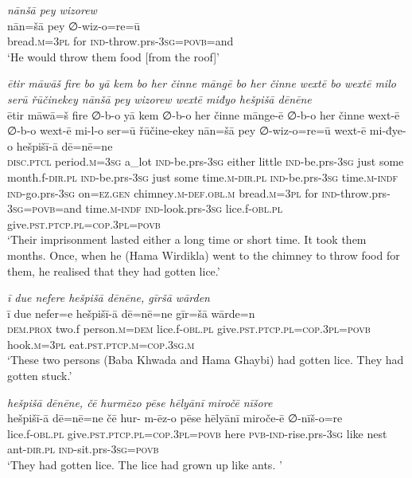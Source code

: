 \ea \label{BP.146}
\textit{nānšā pey wizorew} \\ 
\gll nān=šā pey ∅-wiz-o=re=ū \\ 
 bread\textsc{.m}\textsc{=3pl} for \textsc{ind-}throw.prs\textsc{-3sg}\textsc{=\textsc{povb}}=and \\ 
\glt `He would throw them food [from the roof]'
\z 
 
\ea \label{BP.149}
\textit{ētir māwāš fire bo yā kem bo her činne māngē bo her činne wextē bo wextē milo serū řūčinekey nānšā pey wizorew wextē miđyo hešpišā dēnēne} \\ 
\gll ētir māwā=š fire ∅-b-o yā kem ∅-b-o her činne mānge-ē ∅-b-o her činne wext-ē ∅-b-o wext-ē mi-l-o ser=ū řūčine-ekey nān=šā pey ∅-wiz-o=re=ū wext-ē mi-đye-o hešpišī-ā dē=nē=ne \\ 
 \textsc{disc.ptcl} period\textsc{.m}\textsc{=3sg} a\_lot \textsc{ind-}be.prs\textsc{-3sg} either little \textsc{ind-}be.prs\textsc{-3sg} just some month.f\textsc{-dir}\textsc{.pl} \textsc{ind-}be.prs\textsc{-3sg} just some time\textsc{.m}\textsc{-dir}\textsc{.pl} \textsc{ind-}be.prs\textsc{-3sg} time\textsc{.m}\textsc{-indf} \textsc{ind-}go.prs\textsc{-3sg} on\textsc{=ez.gen} chimney\textsc{.m}\textsc{-def}\textsc{.obl}\textsc{.m} bread\textsc{.m}\textsc{=3pl} for \textsc{ind-}throw.prs\textsc{-3sg}\textsc{=\textsc{povb}}=and time\textsc{.m}\textsc{-indf} \textsc{ind-}look.prs\textsc{-3sg} lice.f\textsc{-obl}\textsc{.pl} give\textsc{.pst}\textsc{.ptcp}\textsc{.pl}\textsc{=cop}\textsc{.3pl}\textsc{=\textsc{povb}} \\ 
\glt `Their imprisonment lasted either a long time or short time. It took them months. Once, when he (Hama Wirdikla) went to the chimney to throw food for them, he realised that they had gotten lice.'
\z 
 
\ea \label{BP.150}
\textit{ī due nefere hešpišā dēnēne, gīršā wārden} \\ 
\gll ī due nefer=e hešpišī-ā dē=nē=ne gīr=šā wārde=n \\ 
 \textsc{dem.prox} two.f person\textsc{.m}\textsc{=dem} lice.f\textsc{-obl}\textsc{.pl} give\textsc{.pst}\textsc{.ptcp}\textsc{.pl}\textsc{=cop}\textsc{.3pl}\textsc{=\textsc{povb}} hook\textsc{.m}\textsc{=3pl} eat\textsc{.pst}\textsc{.ptcp}\textsc{.m}\textsc{=cop}\textsc{.3sg}\textsc{.m} \\ 
\glt `These two persons (Baba Khwada and Hama Ghaybi) had gotten lice. They had gotten stuck.'
\z 
 
\ea \label{BP.151}
\textit{hešpišā dēnēne, čē hurmēzo pēse hēlyānī miročē nīšore} \\ 
\gll hešpišī-ā dē=nē=ne čē hur- m-ēz-o pēse hēlyānī miroče-ē ∅-nīš-o=re \\ 
 lice.f\textsc{-obl}\textsc{.pl} give\textsc{.pst}\textsc{.ptcp}\textsc{.pl}\textsc{=cop}\textsc{.3pl}\textsc{=\textsc{povb}} here \textsc{pvb-}\textsc{ind-}rise.prs\textsc{-3sg} like nest ant\textsc{-dir}\textsc{.pl} \textsc{ind-}sit.prs\textsc{-3sg}\textsc{=\textsc{povb}} \\ 
\glt `They had gotten lice. The lice had grown up like ants. '
\z 
 
